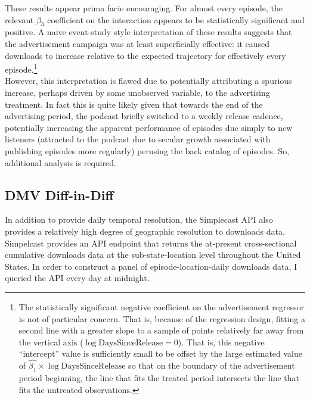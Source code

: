 \documentclass[11pt, letterpaper, twoside]{article}
\begin{document}
These results appear prima facie encouraging. For almost every episode, the relevant $\beta_3$ coefficient on the interaction appears to be statistically significant and positive. A naive event-study style interpretation of these results suggests that the advertisement campaign was at least superficially effective: it caused downloads to increase relative to the expected trajectory for effectively every episode.\footnote{The statistically significant negative coefficient on the advertisement regressor is not of particular concern. That is, because of the regression design, fitting a second line with a greater slope to a sample of points relatively far away from the vertical axis ($\log \text{DaysSinceRelease}=0$). That is, this negative ``intercept'' value is sufficiently small to be offset by the large estimated value of $\hat{\beta_1}\times\log\text{DaysSinceRelease}$ so that on the boundary of the advertisement period beginning, the line that fits the treated period intersects the line that fits the untreated observations.} \\

However, this interpretation is flawed due to potentially attributing a spurious increase, perhaps driven by some unobserved variable, to the advertising treatment. In fact this is quite likely given that towards the end of the advertising period, the podcast briefly switched to a weekly release cadence, potentially increasing the apparent performance of episodes due simply to new listeners (attracted to the podcast due to secular growth associated with publishing episodes more regularly) perusing the back catalog of episodes. So, additional analysis is required.

\subsection{DMV Diff-in-Diff}
In addition to provide daily temporal resolution, the Simplecast API also provides a relatively high degree of geographic resolution to downloads data. Simpelcast provides an API endpoint that returns the at-present cross-sectional cumulative downloads data at the sub-state-location level throughout the United States. In order to construct a panel of episode-location-daily downloads data, I queried the API every day at midnight.\\
\end{document}

